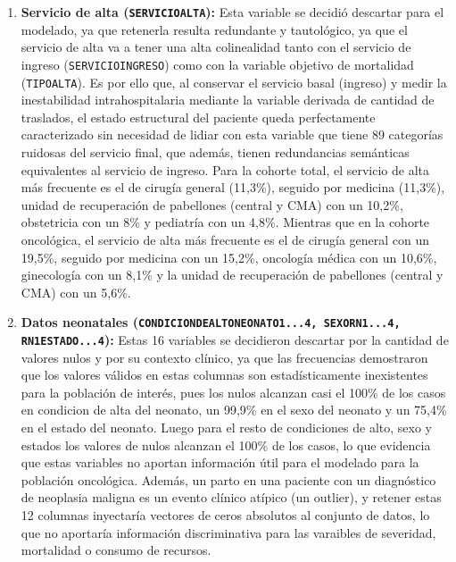 \begin{enumerate}
    \item \textbf{Servicio de alta (\texttt{SERVICIOALTA}):} Esta variable se decidió descartar para el modelado, ya que retenerla resulta redundante y tautológico, ya que el servicio de alta va a tener una alta colinealidad tanto con el servicio de ingreso (\texttt{SERVICIOINGRESO}) como con la variable objetivo de mortalidad (\texttt{TIPOALTA}). Es por ello que, al conservar el servicio basal (ingreso) y medir la inestabilidad intrahospitalaria mediante la variable derivada de cantidad de traslados, el estado estructural del paciente queda perfectamente caracterizado sin necesidad de lidiar con esta variable que tiene 89 categorías ruidosas del servicio final, que además, tienen redundancias semánticas equivalentes al servicio de ingreso. Para la cohorte total, el servicio de alta más frecuente es el de cirugía general (11,3\%), seguido por medicina (11,3\%), unidad de recuperación de pabellones (central y CMA) con un 10,2\%, obstetricia con un 8\% y pediatría con un 4,8\%. Mientras que en la cohorte oncológica, el servicio de alta más frecuente es el de cirugía general con un 19,5\%, seguido por medicina con un 15,2\%, oncología médica con un 10,6\%, ginecología con un 8,1\% y la unidad de recuperación de pabellones (central y CMA) con un 5,6\%.
    \item \textbf{Datos neonatales (\texttt{CONDICIONDEALTONEONATO1...4, SEXORN1...4, RN1ESTADO...4}):} Estas 16 variables se decidieron descartar por la cantidad de valores nulos y por su contexto clínico, ya que las frecuencias demostraron que los valores válidos en estas columnas son estadísticamente inexistentes para la población de interés, pues los nulos alcanzan casi el 100\% de los casos en condicion de alta del neonato, un 99,9\% en el sexo del neonato y un 75,4\% en el estado del neonato. Luego para el resto de condiciones de alto, sexo y estados los valores de nulos alcanzan el 100\% de los casos, lo que evidencia que estas variables no aportan información útil para el modelado para la población oncológica.  Además, un parto en una paciente con un diagnóstico de neoplasia maligna es un evento clínico atípico (un outlier), y retener estas 12 columnas inyectaría vectores de ceros absolutos al conjunto de datos, lo que no aportaría información discriminativa para las varaibles de severidad, mortalidad o consumo de recursos. 

\end{enumerate}

